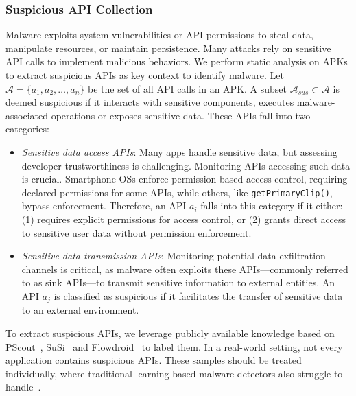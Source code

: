 \subsubsection{Suspicious API Collection}
Malware exploits system vulnerabilities or API permissions to steal data, manipulate resources, or maintain persistence. Many attacks rely on sensitive API calls to implement malicious behaviors. We perform static analysis on APKs to extract suspicious APIs as key context to identify malware. Let $\mathcal{A} = \{a_1, a_2, \ldots, a_n\}$ be the set of all API calls in an APK. A subset $\mathcal{A}_{sus} \subset \mathcal{A}$ is deemed suspicious if it interacts with sensitive components, executes malware-associated operations or exposes sensitive data. These APIs fall into two categories:
\begin{itemize}
    \item \textit{Sensitive data access APIs}: Many apps handle sensitive data, but assessing developer trustworthiness is challenging. Monitoring APIs accessing such data is crucial. Smartphone OSs enforce permission-based access control, requiring declared permissions for some APIs, while others, like \verb|getPrimaryClip()|, bypass enforcement. Therefore, an API $a_i$ falls into this category if it either: (1) requires explicit permissions for access control, or (2) grants direct access to sensitive user data without permission enforcement.
    \item \textit{Sensitive data transmission APIs}: Monitoring potential data exfiltration channels is critical, as malware often exploits these APIs—commonly referred to as sink APIs—to transmit sensitive information to external entities. An API $a_j$ is classified as suspicious if it facilitates the transfer of sensitive data to an external environment.
\end{itemize}

To extract suspicious APIs, we leverage publicly available knowledge based on PScout~\cite{pscout}, SuSi~\cite{susi} and Flowdroid~\cite{flowdroid} to label them. In a real-world setting, not every application contains suspicious APIs. These samples should be treated individually, where traditional learning-based malware detectors also struggle to handle~\cite{he2022msdroid}.


